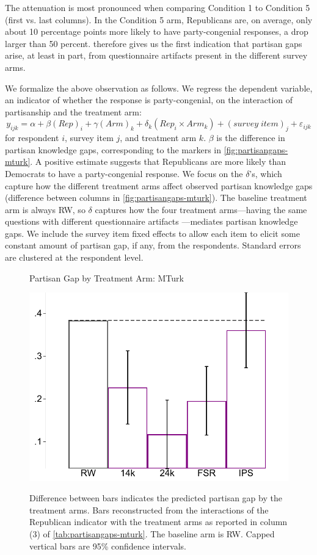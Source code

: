 \documentclass[12pt, letterpaper]{article}
\begin{document}
The attenuation is most pronounced when comparing Condition 1 to Condition 5 (first vs. last columns). In the Condition 5 arm, Republicans are, on average, only about 10 percentage points more likely to have party-congenial responses, a drop larger than 50 percent.  therefore gives us the first indication that partisan gaps arise, at least in part, from questionnaire artifacts present in the different survey arms.

We formalize the above observation as follows. We regress the dependent variable, an indicator of whether the response is party-congenial, on the interaction of partisanship and the treatment arm:
\begin{equation}\label{eq:partisangap-mturk}
y_{ijk} = \alpha + \beta (Rep)_i + \gamma (Arm)_k + \delta_k (Rep_i \times Arm_k) + (survey \; item)_j + \varepsilon_{ijk}
\end{equation}
for respondent $i$, survey item $j$, and treatment arm $k$. $\beta$ is the difference in partisan knowledge gaps, corresponding to the markers in \cref{fig:partisangaps-mturk}. A positive estimate suggests that Republicans are more likely than Democrats to have a party-congenial response. We focus on the $\delta$'s, which capture how the different treatment arms affect observed partisan knowledge gaps (difference between columns in \cref{fig:partisangaps-mturk}). The baseline treatment arm is always RW, so $\delta$ captures
how the four treatment arms---having the same questions with different questionnaire artifacts ---mediates partisan knowledge gaps.
We include the survey item fixed effects to allow each item to elicit some constant amount of partisan gap, if any, from the respondents. Standard errors are clustered at the respondent level.

\begin{figure}[t]
	\centering
	\caption{Partisan Gap by Treatment Arm: MTurk}
	\includegraphics[width=.55\textwidth]{../figs/mturk-pgag-surveyarms.pdf}
	\label{fig:partisangaps-mturk-reg}
	\caption*{\footnotesize 
		Difference between bars indicates the predicted partisan gap by the treatment arms. 
		Bars reconstructed from the interactions of the Republican indicator with the treatment arms as reported in column (3) of \cref{tab:partisangaps-mturk}.
		The baseline arm is RW.
		Capped vertical bars are 95\% confidence intervals.
	}
\end{figure}
\end{document}
